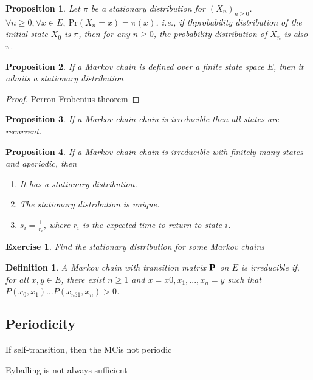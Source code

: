 \documentclass[12pt,a4paper]{article}
\newtheorem{proposition}{Proposition}
\newtheorem{definition}{Definition}
\newtheorem{exercise}{Exercise}
\newcommand{\bP}{\bold P}
\begin{document}
\begin{proposition}
	Let $\pi$ be a stationary distribution for $(X_n)_{n\geq0}$. 
	$\forall n \geq 0, \forall x \in E,\ \text{Pr}(X_n = x) = \pi(x)$, i.e., if thprobability distribution of the initial state $X_0$ is $\pi$, then for any $n\geq 0$, the probability distribution of $X_n$ is also $\pi$.
\end{proposition}

\begin{proposition}
	If a Markov chain is defined over a finite state space $E$, then it admits a stationary distribution
	\end{proposition}
	\begin{proof}
		Perron-Frobenius theorem
	\end{proof}


\begin{proposition}
	If a Markov chain chain is irreducible then all states are recurrent.
\end{proposition}
	
	
\begin{proposition}
	If a Markov chain chain is irreducible with finitely many states and aperiodic, then
	\begin{enumerate}
		\item It has a stationary distribution.
		\item The stationary distribution is unique.
		\item $s_i = \frac{1}{r_i}$, where $r_i$ is the expected time to return to state $i$. 
	\end{enumerate}
\end{proposition}
	
	
	\begin{exercise}
		Find the stationary distribution for some Markov chains
		\end{exercise}
		
	\begin{definition}
		A Markov chain with transition matrix $\bP$ on $E$ is irreducible if, for all $x, y \in E$, there exist $n \geq 1$ and $x = x0, x_1, . . . , x_n = y$ such that $P(x_0, x_1) \ldots P(x_{n?1}, x_n) > 0$.
		\end{definition}
	
\subsection{Periodicity}
If self-transition, then the MCis not periodic

Eyballing is not always sufficient
\end{document}
